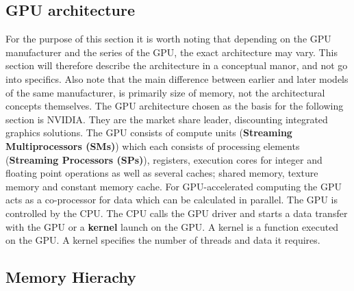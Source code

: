 \subsection{GPU architecture}
For the purpose of this section it is worth noting that depending on the GPU manufacturer and the series of the GPU, the exact architecture may vary.
This section will therefore describe the architecture in a conceptual manor, and not go into specifics. 
Also note that the main difference between earlier and later models of the same manufacturer, is primarily size of memory, not the architectural concepts themselves.
The GPU architecture chosen as the basis for the following section is NVIDIA. 
They are the market share leader, discounting integrated graphics solutions. 
The GPU consists of compute units (\textbf{Streaming Multiprocessors (SMs)}) which each consists of processing elements (\textbf{Streaming Processors (SPs)}), registers, execution cores for integer and floating point operations as well as several caches; shared memory, texture memory and constant memory cache.
For GPU-accelerated computing the GPU acts as a co-processor for data which can be calculated in parallel.
The GPU is controlled by the CPU.
The CPU calls the GPU driver and starts a data transfer with the GPU or a \textbf{kernel} launch on the GPU.
A kernel is a function executed on the GPU. %
A kernel specifies the number of threads and data it requires.
\subsection{Memory Hierachy}

